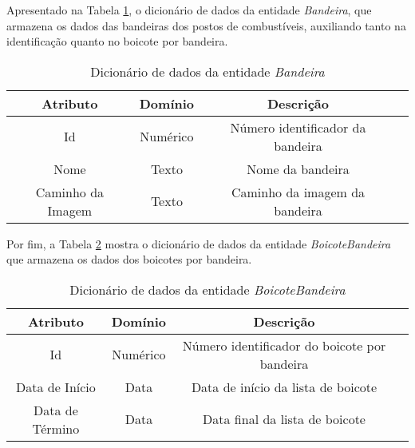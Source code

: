Apresentado na Tabela \ref{dic:flag}, o dicionário de dados da entidade \textit{Bandeira}, que armazena os dados das bandeiras dos postos de combustíveis, auxiliando tanto na identificação quanto no boicote por bandeira.

\begin{table}[H]
\centering
\caption{Dicionário de dados da entidade \textit{Bandeira}}
\label{dic:flag}
\begin{tabular}{|c|c|c|c|}\hline
\textbf{Atributo} & \textbf{Domínio} & \textbf{Descrição}   \\ \hline
Id                            & Numérico                                                       & Número identificador da bandeira \\ \hline
Nome                      & Texto                                           & Nome da bandeira \\ \hline
Caminho da Imagem                       & Texto                                           & Caminho da imagem da bandeira\\ \hline

\end{tabular}
\end{table}

Por fim, a Tabela \ref{dic:flag_boycott} mostra o dicionário de dados da entidade \textit{BoicoteBandeira} que armazena os dados dos boicotes por bandeira.

\begin{table}[H]
\centering
\caption{Dicionário de dados da entidade \textit{BoicoteBandeira}}
\label{dic:flag_boycott}
\begin{tabular}{|c|c|c|c|}\hline
\textbf{Atributo} & \textbf{Domínio}  & \textbf{Descrição}   \\ \hline
Id                            & Numérico                                                       & Número identificador do boicote por bandeira \\ \hline
Data de Início                      & Data                                           & Data de início da lista de boicote \\ \hline
Data de Término                       & Data                                         & Data final da lista de boicote\\ \hline

\end{tabular}
\end{table}
